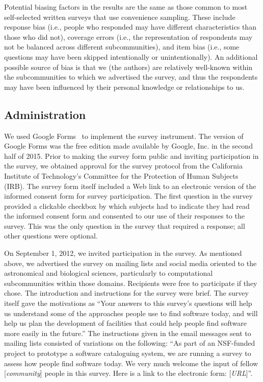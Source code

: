 \documentclass{casicswhitepaper}
\begin{document}
Potential biasing factors in the results are the same as those common to most self-selected written surveys that use convenience sampling.  These include response bias (i.e., people who responded may have different characteristics than those who did not), coverage errors (i.e., the representation of respondents may not be balanced across different subcommunities), and item bias (i.e., some questions may have been skipped intentionally or unintentionally).  An additional possible source of bias is that we (the authors) are relatively well-known within the subcommunities to which we advertised the survey, and thus the respondents may have been influenced by their personal knowledge or relationships to us.  


\subsection{Administration}

We used Google Forms~\cite{googleforms} to implement the survey instrument.  The version of Google Forms was the free edition made available by Google, Inc. in the second half of 2015.  Prior to making the survey form public and inviting participation in the survey, we obtained approval for the survey protocol from the California Institute of Technology's Committee for the Protection of Human Subjects (IRB).  The survey form itself included a Web link to an electronic version of the informed consent form for survey participation.  The first question in the survey provided a clickable checkbox by which subjects had to indicate they had read the informed consent form and consented to our use of their responses to the survey.  This was the only question in the survey that required a response; all other questions were optional.

On September 1, 2012, we invited participation in the survey.  As mentioned above, we advertised the survey on mailing lists and social media oriented to the astronomical and biological sciences, particularly to computational subcommunities within those domains.  Recipients were free to participate if they chose.  The introduction and instructions for the survey were brief.  The survey itself gave the motivations as ``Your answers to this survey's questions will help us understand some of the approaches people use to find software today, and will help us plan the development of facilities that could help people find software more easily in the future.''  The instructions given in the email messages sent to mailing lists consisted of variations on the following: ``As part of an NSF-funded project to prototype a software cataloguing system, we are running a survey to assess how people find software today.  We very much welcome the input of fellow [\emph{community}] people in this survey.  Here is a link to the electronic form: [\emph{URL}]''.
\end{document}

